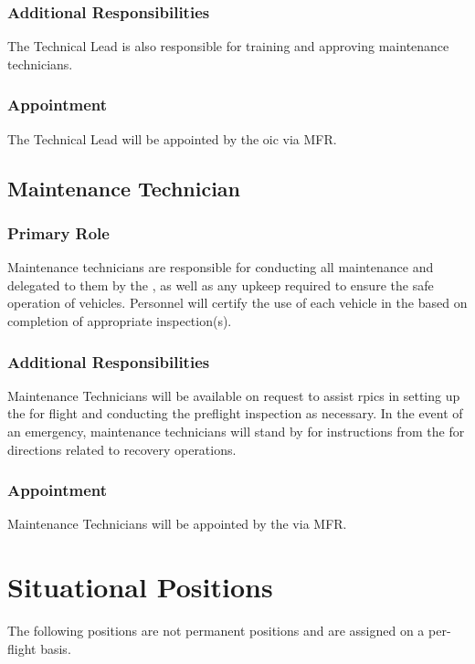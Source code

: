             \subsubsection{Additional Responsibilities}The \projectmars{} Technical Lead is also responsible for training and approving maintenance technicians.
               
            \subsubsection{Appointment} The \projectmars{} Technical Lead will be appointed by the \projectmars{} \ac{oic} via MFR.
    
        \subsection{Maintenance Technician}\label{role:maintenancetech}
    
            \subsubsection{Primary Role} Maintenance technicians are responsible for conducting all maintenance and delegated to them by the , as well as any upkeep required to ensure the safe operation of \projectmars{} vehicles. Personnel will certify the use of each vehicle in the \projectmars{} based on completion of appropriate inspection(s).
        
            \subsubsection{Additional Responsibilities}Maintenance Technicians will be available on request to assist \ac{rpic}s in setting up the \projectmars{} for flight and conducting the preflight inspection as necessary. In the event of an emergency, maintenance technicians will stand by for instructions from the \projectmars{} for directions related to recovery operations.
        
            \subsubsection{Appointment} Maintenance Technicians will be appointed by the  via MFR.

    \section{Situational Positions}  The following positions are not permanent positions and are assigned on a per-flight basis. 

